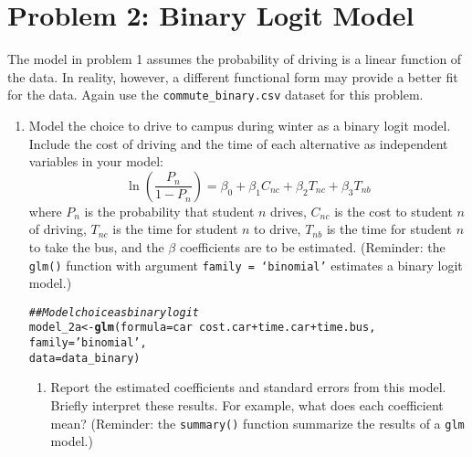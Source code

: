 \documentclass[11pt,letterpaper]{article}\usepackage[]{graphicx}\usepackage[]{color}
\makeatletter
\newcommand{\hlstr}[1]{\textcolor[rgb]{0.192,0.494,0.8}{#1}}%
\newcommand{\hlcom}[1]{\textcolor[rgb]{0.678,0.584,0.686}{\textit{#1}}}%
\newcommand{\hlopt}[1]{\textcolor[rgb]{0,0,0}{#1}}%
\newcommand{\hlstd}[1]{\textcolor[rgb]{0.345,0.345,0.345}{#1}}%
\newcommand{\hlkwb}[1]{\textcolor[rgb]{0.69,0.353,0.396}{#1}}%
\newcommand{\hlkwc}[1]{\textcolor[rgb]{0.333,0.667,0.333}{#1}}%
\newcommand{\hlkwd}[1]{\textcolor[rgb]{0.737,0.353,0.396}{\textbf{#1}}}%
\newenvironment{kframe}{%
 \def\at@end@of@kframe{}%
 \ifinner\ifhmode%
  \def\at@end@of@kframe{\end{minipage}}%
  \begin{minipage}{\columnwidth}%
 \fi\fi%
 \def\FrameCommand##1{\hskip\@totalleftmargin \hskip-\fboxsep
 \colorbox{shadecolor}{##1}\hskip-\fboxsep
     \hskip-\linewidth \hskip-\@totalleftmargin \hskip\columnwidth}%
 \MakeFramed {\advance\hsize-\width
   \@totalleftmargin\z@ \linewidth\hsize
   \@setminipage}}%
 {\par\unskip\endMakeFramed%
 \at@end@of@kframe}
\newenvironment{knitrout}{}{} %
\makeatother
\begin{document}
\section*{Problem 2: Binary Logit Model}

The model in problem 1 assumes the probability of driving is a linear function of the data. In reality, however, a different functional form may provide a better fit for the data. Again use the \texttt{commute\_binary.csv} dataset for this problem.

\begin{enumerate}[label=\alph*., leftmargin=*]
	\item Model the choice to drive to campus during winter as a binary logit model. Include the cost of driving and the time of each alternative as independent variables in your model:
$$\ln \left( \frac{P_n}{1 - P_n} \right) = \beta_0 + \beta_1 C_{nc} + \beta_2 T_{nc} + \beta_3 T_{nb}$$
where $P_n$ is the probability that student $n$ drives, $C_{nc}$ is the cost to student $n$ of driving, $T_{nc}$ is the time for student $n$ to drive, $T_{nb}$ is the time for student $n$ to take the bus, and the $\beta$ coefficients are to be estimated. (Reminder: the \texttt{glm()} function with argument \texttt{family = `binomial'} estimates a binary logit model.)

\begin{knitrout}
\color{fgcolor}\begin{kframe}
\begin{alltt}
\hlcom{## Model choice as binary logit}
\hlstd{model_2a} \hlkwb{<-} \hlkwd{glm}\hlstd{(}\hlkwc{formula} \hlstd{= car} \hlopt{~} \hlstd{cost.car} \hlopt{+} \hlstd{time.car} \hlopt{+} \hlstd{time.bus,}
                \hlkwc{family} \hlstd{=} \hlstr{'binomial'}\hlstd{,}
                \hlkwc{data} \hlstd{= data_binary)}
\end{alltt}
\end{kframe}
\end{knitrout}

	\begin{enumerate}[label=\roman*.]
		\item Report the estimated coefficients and standard errors from this model. Briefly interpret these results. For example, what does each coefficient mean? (Reminder: the \texttt{summary()} function summarize the results of a \texttt{glm} model.)


\end{enumerate}
\end{enumerate}
\end{document}
